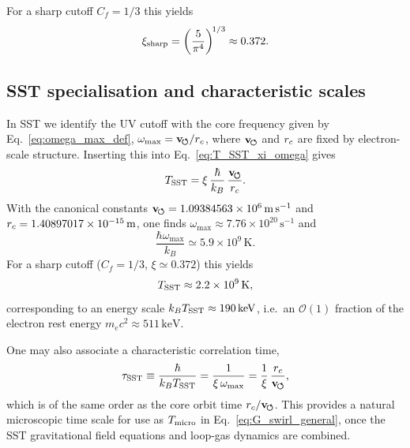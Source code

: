\documentclass[11pt]{article}
\begin{document}
            For a sharp cutoff $C_f = 1/3$ this yields
            \begin{equation}
                \xi_{\rm sharp}
                = \left(\frac{5}{\pi^4}\right)^{\!1/3}
                \approx 0.372.
            \end{equation}

        \subsection{SST specialisation and characteristic scales}

            In SST we identify the UV cutoff with the core frequency given by
            Eq.~\eqref{eq:omega_max_def}, $\omega_{\max} = \mathbf{v}_{\!\boldsymbol{\circlearrowleft}}/r_c$, where
            $\mathbf{v}_{\!\boldsymbol{\circlearrowleft}}$ and $r_c$ are fixed by electron-scale structure.  Inserting
            this into Eq.~\eqref{eq:T_SST_xi_omega} gives
            \begin{equation}
                T_{\rm SST}
                = \xi\,\frac{\hbar}{k_B}\,\frac{\mathbf{v}_{\!\boldsymbol{\circlearrowleft}}}{r_c}.
                \label{eq:T_SST_SSTform}
            \end{equation}
            With the canonical constants
            $\mathbf{v}_{\!\boldsymbol{\circlearrowleft}} = 1.09384563\times 10^{6}\,\mathrm{m\,s^{-1}}$ and
            $r_c = 1.40897017\times 10^{-15}\,\mathrm{m}$, one finds
            $\omega_{\max} \approx 7.76\times 10^{20}\,\mathrm{s^{-1}}$ and
            \begin{equation}
                \frac{\hbar\omega_{\max}}{k_B}
                \simeq 5.9\times 10^9\,\mathrm{K}.
            \end{equation}
            For a sharp cutoff ($C_f=1/3$, $\xi\simeq 0.372$) this yields
            \begin{equation}
                T_{\rm SST}
                \approx 2.2\times 10^9\,\mathrm{K},
            \end{equation}
            corresponding to an energy scale
            $k_B T_{\rm SST}\approx 190\,\mathrm{keV}$, i.e.\ an $\mathcal{O}(1)$
            fraction of the electron rest energy $m_e c^2 \approx 511\,\mathrm{keV}$.

            One may also associate a characteristic correlation time,
            \begin{equation}
                \tau_{\rm SST}
                \equiv \frac{\hbar}{k_B T_{\rm SST}}
                = \frac{1}{\xi\,\omega_{\max}}
                = \frac{1}{\xi}\,\frac{r_c}{\mathbf{v}_{\!\boldsymbol{\circlearrowleft}}},
            \end{equation}
            which is of the same order as the core orbit time
            $r_c/\mathbf{v}_{\!\boldsymbol{\circlearrowleft}}$.  This provides a natural microscopic time scale
            for use as $T_{\rm micro}$ in Eq.~\eqref{eq:G_swirl_general}, once the
            SST gravitational field equations and loop-gas dynamics are combined.
\end{document}
